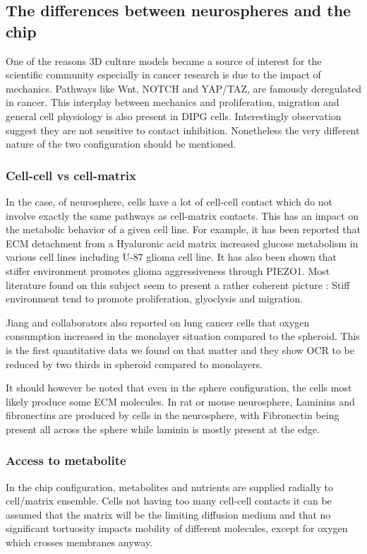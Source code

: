 \documentclass[11pt,a4paper]{article}
\begin{document}
\subsection{The differences between neurospheres and the chip}
One of the reasons 3D culture models became a source of interest for the scientific community especially in cancer research is due to the impact of mechanics.\cite{Romani2020} Pathways like Wnt, NOTCH and YAP/TAZ, are famously deregulated in cancer. This interplay between mechanics and proliferation, migration  and general cell physiology is also present in DIPG cells. Interestingly observation suggest they are not sensitive to contact inhibition. Nonetheless the very different nature of the two configuration should be mentioned.

\subsubsection{Cell-cell vs cell-matrix}
In the case, of neurosphere, cells have a lot of cell-cell contact which do not involve exactly the same pathways as cell-matrix contacts. This has an impact on the metabolic behavior of a given cell line. For example, it has been reported that ECM detachment from a Hyaluronic acid matrix increased glucose metabolism in various cell lines including U-87 glioma cell line.\cite{Sullivan2018} It has also been shown that stiffer environment promotes glioma aggressiveness through PIEZO1.\cite{ChenX2018} Most literature found on this subject seem to present a rather coherent picture : Stiff environment tend to promote proliferation, glyoclysis and migration. \cite{Chen2021}\cite{Barnes2017}

Jiang and collaborators also reported on lung cancer cells that oxygen consumption increased in the monolayer situation compared to the spheroid. This is the first quantitative data we found on that matter and they show OCR to be reduced by two thirds in spheroid compared to monolayers.\cite{Jiang2016}

It should however be noted that even in the sphere configuration, the cells most likely produce some ECM molecules. In rat or mouse neurosphere, Laminins and fibronectins are produced by cells in the neurosphere, with Fibronectin being present all across the sphere while laminin is mostly present at the edge.\cite{Campos2004}

\subsubsection{Access to metabolite}
In the chip configuration, metabolites and nutrients are supplied radially to cell/matrix ensemble. Cells not having too many cell-cell contacts it can be assumed that the matrix will be the limiting diffusion medium and that no significant tortuosity impacts mobility of different molecules, except for oxygen which crosses membranes anyway. 
\end{document}
